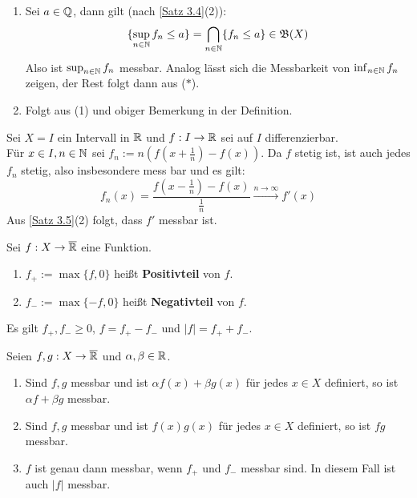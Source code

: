 \documentclass[a4paper,twoside,DIV15,BCOR12mm,chapterprefix=true,headings=onelinechapter]{scrbook}
\begin{document}
\begin{beweis}
\begin{enumerate}
\item Sei $a\in\mathbb{Q}$, dann gilt (nach \ref{Satz 3.4}(2)):
\[\{\sup_{n\in\mathbb{N}} f_n\le a\}=\bigcap_{n\in\mathbb{N}}\{f_n\le a\}\in\mathfrak{B}(X)\]
Also ist $\sup_{n\in\mathbb{N}} f_n$ messbar. Analog lässt sich die Messbarkeit von $\inf_{n\in\mathbb{N}} f_n$ zeigen, der Rest folgt dann aus ($*$).
\item Folgt aus (1) und obiger Bemerkung in der Definition.
\end{enumerate}
\end{beweis}

\begin{beispiel}
Sei $X=I$ ein Intervall in $\mathbb{R}$ und $f:I\to\mathbb{R}$ sei auf $I$ differenzierbar.\\
Für $x\in I,n\in\mathbb{N}$ sei $f_n:= n(f(x+\frac1n)-f(x))$. Da $f$ stetig ist, ist auch jedes $f_n$ stetig, also insbesondere mess bar und es gilt:
\[f_n(x)=\frac{f(x-\frac1n)-f(x)}{\frac1n}\stackrel{n\to\infty}{\to}f'(x)\]
Aus \ref{Satz 3.5}(2) folgt, dass $f'$ messbar ist. 
\end{beispiel}

\begin{definition}
Sei $f:X\to\overline{\mathbb{R}}$ eine Funktion.
\begin{enumerate}
\item $f_+:=\max\{f,0\}$ heißt \textbf{Positivteil} von $f$.
\item $f_-:=\max\{-f,0\}$ heißt \textbf{Negativteil} von $f$.
\end{enumerate}
Es gilt $f_+,f_-\ge 0$, $f=f_+-f_-$ und $|f|=f_++f_-$.
\end{definition}

\begin{satz}
\label{Satz 3.6}
Seien $f,g:X\to\overline{\mathbb{R}}$ und $\alpha,\beta\in\mathbb{R}$.
\begin{enumerate}
\item Sind $f,g$ messbar und ist $\alpha f(x)+\beta g(x)$ für jedes $x\in X$ definiert, so ist $\alpha f+\beta g$ messbar.
\item Sind $f,g$ messbar und ist $f(x)g(x)$ für jedes $x\in X$ definiert, so ist $fg$ messbar.
\item $f$ ist genau dann messbar, wenn $f_+$ und $f_-$ messbar sind. In diesem Fall ist auch $|f|$ messbar.
\end{enumerate}
\end{satz}
\end{document}
